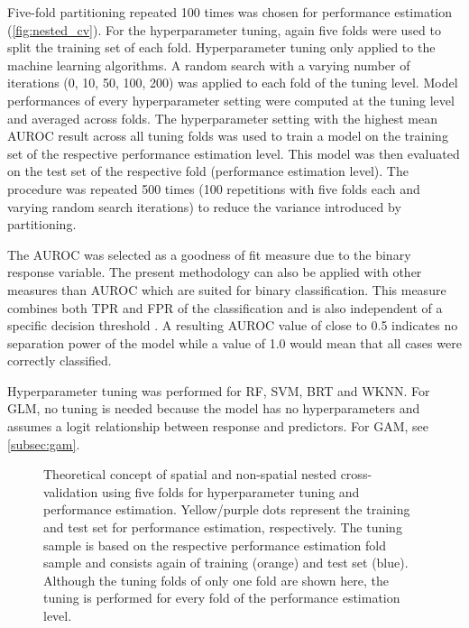 \documentclass[review]{elsarticle}
\begin{document}
Five-fold partitioning repeated 100 times was chosen for performance estimation (\autoref{fig:nested_cv}).
For the hyperparameter tuning, again five folds were used to split the training set of each fold.
Hyperparameter tuning only applied to the machine learning algorithms.
A random search with a varying number of iterations (0, 10, 50, 100, 200) was applied to each fold of the tuning level.
Model performances of every hyperparameter setting were computed at the tuning level and averaged across folds.
The hyperparameter setting with the highest mean \ac{AUROC} result across all tuning folds was used to train a model on the training set of the respective performance estimation level.
This model was then evaluated on the test set of the respective fold (performance estimation level).
The procedure was repeated 500 times (100 repetitions with five folds each and varying random search iterations) to reduce the variance introduced by partitioning.

The \ac{AUROC} was selected as a goodness of fit measure due to the binary response variable.
The present methodology can also be applied with other measures than AUROC which are suited for binary classification.
This measure combines both \ac{TPR} and \ac{FPR} of the classification and is also independent of a specific decision threshold \citep{Candy2013}.
A resulting \ac{AUROC} value of close to 0.5 indicates no separation power of the model while a value of 1.0 would mean that all cases were correctly classified.

Hyperparameter tuning was performed for \ac{RF}, \ac{SVM}, \ac{BRT} and \ac{WKNN}.
For \ac{GLM}, no tuning is needed because the model has no hyperparameters and assumes a logit relationship between response and predictors.
For \ac{GAM}, see \autoref{subsec:gam}.

\begin{figure} [t!]
	\begin{center}
		\caption[]{Theoretical concept of spatial and non-spatial nested cross-validation using five folds for hyperparameter tuning and performance estimation.
			Yellow/purple dots represent the training and test set for performance estimation, respectively.
			The tuning sample is based on the respective performance estimation fold sample and consists again of training (orange) and test set (blue).
			Although the tuning folds of only one fold are shown here, the tuning is performed for every fold of the performance estimation level.}
		\label{fig:nested_cv}
	\end{center}
\end{figure}
\end{document}
